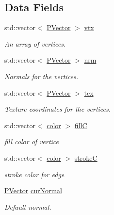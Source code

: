 \subsection*{\-Data \-Fields}
\begin{DoxyCompactItemize}
\item 
std\-::vector$<$ \hyperlink{classcprocessing_1_1PVector}{\-P\-Vector} $>$ \hyperlink{structPPath_a155917dd334970ab34db0d305d7d35ca}{vtx}
\begin{DoxyCompactList}\small\item\em \-An array of vertices. \end{DoxyCompactList}\item 
std\-::vector$<$ \hyperlink{classcprocessing_1_1PVector}{\-P\-Vector} $>$ \hyperlink{structPPath_af14a5a7b4b9fa1ff51107c044b2be149}{nrm}
\begin{DoxyCompactList}\small\item\em \-Normals for the vertices. \end{DoxyCompactList}\item 
std\-::vector$<$ \hyperlink{classcprocessing_1_1PVector}{\-P\-Vector} $>$ \hyperlink{structPPath_acda3dc5da7e49ceab397ba6d69190196}{tex}
\begin{DoxyCompactList}\small\item\em \-Texture coordinates for the vertices. \end{DoxyCompactList}\item 
std\-::vector$<$ \hyperlink{classcprocessing_1_1color}{color} $>$ \hyperlink{structPPath_a59d5f8999f43e0d1e439418f6f236d45}{fill\-C}
\begin{DoxyCompactList}\small\item\em fill color of vertice \end{DoxyCompactList}\item 
std\-::vector$<$ \hyperlink{classcprocessing_1_1color}{color} $>$ \hyperlink{structPPath_a9617b499180498fafdb36f206b9e4831}{stroke\-C}
\begin{DoxyCompactList}\small\item\em stroke color for edge \end{DoxyCompactList}\item 
\hyperlink{classcprocessing_1_1PVector}{\-P\-Vector} \hyperlink{structPPath_ad6cdebaac653dd51a50cde8ef566a42c}{cur\-Normal}
\begin{DoxyCompactList}\small\item\em \-Default normal. \end{DoxyCompactList}\item 

\end{DoxyCompactItemize}
